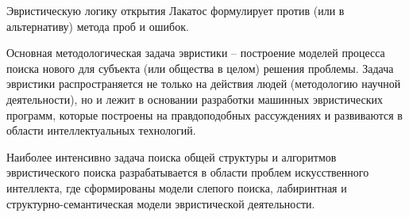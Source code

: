 \documentclass[exam_answers.tex]{subfiles}
\begin{document}
Эвристическую логику открытия Лакатос формулирует против (или в альтернативу) метода проб и ошибок.

Основная методологическая задача эвристики – построение моделей процесса поиска нового для субъекта (или общества в целом) решения проблемы. 
Задача эвристики распространяется не только на действия людей (методологию научной деятельности), но и лежит в основании разработки машинных эвристических программ, которые построены на правдоподобных рассуждениях и развиваются в области интеллектуальных технологий.

Наиболее интенсивно задача поиска общей структуры и алгоритмов эвристического поиска разрабатывается в области проблем искусственного интеллекта, где сформированы модели слепого поиска, лабиринтная и структурно-семантическая модели эвристической деятельности.
\end{document}
